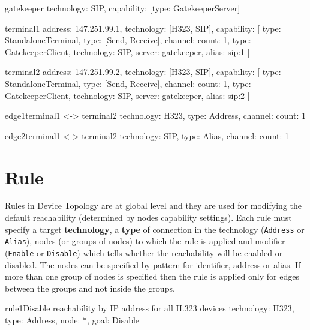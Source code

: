 \documentclass[a4paper]{report}
\begin{document}
\begin{TopologyExample}{gatekeeper}{}
technology: SIP,
capability: [{type: GatekeeperServer}]
\end{TopologyExample}

\begin{TopologyExample}{terminal1}{}
address: 147.251.99.1,
technology: [H323, SIP],
capability: [
  {type: StandaloneTerminal},
  {type: [Send, Receive], channel: {count: 1}}, 
  {type: GatekeeperClient, technology: SIP, server: gatekeeper, alias: sip:1}
]
\end{TopologyExample}

\begin{TopologyExample}{terminal2}{}
address: 147.251.99.2,
technology: [H323, SIP],
capability: [
  {type: StandaloneTerminal},
  {type: [Send, Receive], channel: {count: 1}}, 
  {type: GatekeeperClient, technology: SIP, server: gatekeeper, alias: sip:2}
]
\end{TopologyExample}

\begin{TopologyExample}{edge1}{terminal1 <-> terminal2}
technology: H323,
type: Address,
channel: {count: 1}
\end{TopologyExample}

\begin{TopologyExample}{edge2}{terminal1 <-> terminal2}
technology: SIP,
type: Alias,
channel: {count: 1}
\end{TopologyExample} 
  
  
\section{Rule}
Rules in Device Topology are at global level and they are used for modifying the default reachability (determined by nodes capability settings). Each rule must specify a target \textbf{technology}, a \textbf{type} of connection in the technology (\verb|Address| or \verb|Alias|), nodes (or groups of nodes) to which the rule is applied and modifier (\verb|Enable| or \verb|Disable|) which tells whether the reachability will be enabled or disabled. The nodes can be specified by pattern for identifier, address or alias. If more than one group of nodes is specified then the rule is applied only for edges between the groups and not inside the groups.

\begin{TopologyExample}{rule1}{Disable reachability by IP address for all H.323 devices}
technology: H323,
type: Address,
node: *,
goal: Disable
\end{TopologyExample}
\end{document}
